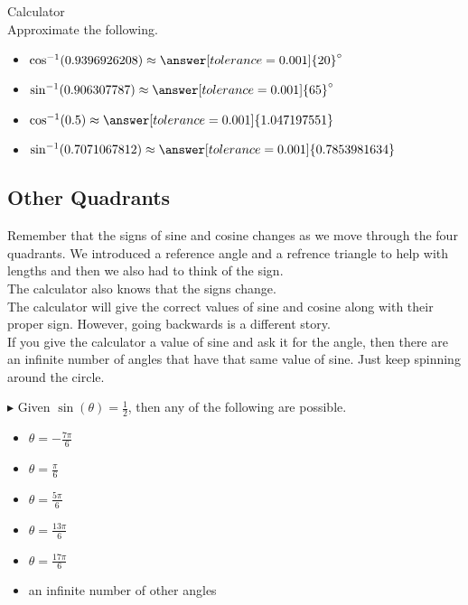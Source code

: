 \documentclass{ximera}
\begin{document}
\begin{question} Calculator \\

Approximate the following.

\begin{itemize}
\item $\cos^{-1}(0.9396926208) \approx \answer[tolerance=0.001]{20}^{\circ}$
\item $\sin^{-1}(0.906307787) \approx \answer[tolerance=0.001]{65}^{\circ}$
\item $\cos^{-1}(0.5) \approx \answer[tolerance=0.001]{1.047197551}$
\item $\sin^{-1}(0.7071067812) \approx \answer[tolerance=0.001]{0.7853981634}$
\end{itemize}

\end{question}




\subsection{Other Quadrants}

Remember that the signs of sine and cosine changes as we move through the four quadrants.  We introduced a reference angle and a refrence triangle to help with lengths and then we also had to think of the sign. \\

The calculator also knows that the signs change. \\

The calculator will give the correct values of sine and cosine along with their proper sign.  However, going backwards is a different story. \\

If you give the calculator a value of sine and ask it for the angle, then there are an infinite number of angles that have that same value of sine.  Just keep spinning around the circle. 



\begin{example}

$\blacktriangleright$ Given  $\sin(\theta) = \frac{1}{2}$, then any of the following are possible.


\begin{itemize}
\item $\theta = -\frac{7\pi}{6}$
\item $\theta = \frac{\pi}{6}$
\item $\theta = \frac{5\pi}{6}$
\item $\theta = \frac{13\pi}{6}$
\item $\theta = \frac{17\pi}{6}$
\item an infinite number of other angles
\end{itemize}


\end{example}
\end{document}
